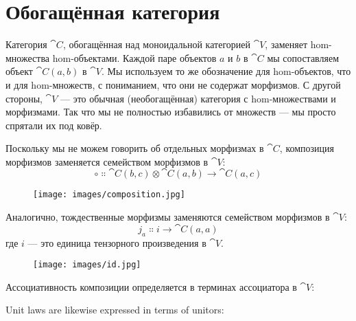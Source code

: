 \section{Обогащённая категория}

Категория $\cat{C}$, обогащённая над моноидальной категорией $\cat{V}$, заменяет
hom-множества hom-объектами. Каждой паре объектов $a$ и
$b$ в $\cat{C}$ мы сопоставляем объект $\cat{C}(a, b)$ в
$\cat{V}$. Мы используем то же обозначение для hom-объектов, что и для
hom-множеств, с пониманием, что они не содержат морфизмов. С
другой стороны, $\cat{V}$ — это обычная (необогащённая) категория с
hom-множествами и морфизмами. Так что мы не полностью избавились от множеств --- мы просто
спрятали их под ковёр.

Поскольку мы не можем говорить об отдельных морфизмах в $\cat{C}$, композиция
морфизмов заменяется семейством морфизмов в $\cat{V}$:
\[\circ \Colon \cat{C}(b, c) \otimes \cat{C}(a, b) \to \cat{C}(a, c)\]

\begin{figure}[H]
  \centering
  \texttt{[image: images/composition.jpg]}
\end{figure}

\noindent
Аналогично, тождественные морфизмы заменяются семейством морфизмов в
$\cat{V}$:
\[j_a \Colon i \to \cat{C}(a, a)\]
где $i$ — это единица тензорного произведения в $\cat{V}$.

\begin{figure}[H]
  \centering
  \texttt{[image: images/id.jpg]}
\end{figure}

\noindent
Ассоциативность композиции определяется в терминах ассоциатора в
$\cat{V}$:

\begin{figure}[H]
  \centering
\end{figure}

\noindent
Unit laws are likewise expressed in terms of unitors:


